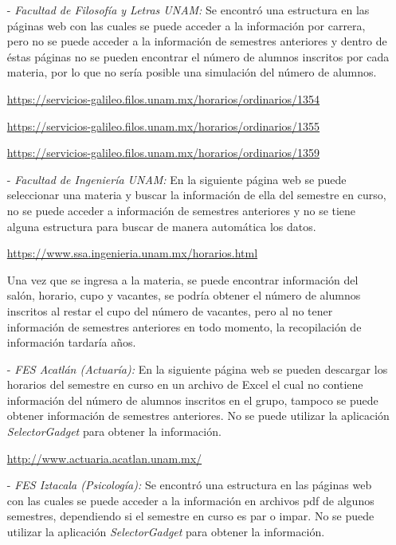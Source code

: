 \begin{itemize}
\item[-] \textit{Facultad de Filosofía y Letras UNAM:} Se encontró una estructura en las páginas web con las cuales se puede acceder a la información por carrera, pero no se puede acceder a la información de semestres anteriores y dentro de éstas páginas no se pueden encontrar el número de alumnos inscritos por cada materia, por lo que no sería posible una simulación del número de alumnos.

\url{https://servicios-galileo.filos.unam.mx/horarios/ordinarios/1354}

\url{https://servicios-galileo.filos.unam.mx/horarios/ordinarios/1355}

\url{https://servicios-galileo.filos.unam.mx/horarios/ordinarios/1359}


\item[-] \textit{Facultad de Ingeniería UNAM:} En la siguiente página web se puede seleccionar una materia y buscar la información de ella del semestre en curso, no se puede acceder a información de semestres anteriores y no se tiene alguna estructura para buscar de manera automática los datos.

\url{https://www.ssa.ingenieria.unam.mx/horarios.html}

Una vez que se ingresa a la materia, se puede encontrar información del salón, horario, cupo y vacantes, se podría obtener el número de alumnos inscritos al restar el cupo del número de vacantes, pero al no tener información de semestres anteriores en todo momento, la recopilación de información tardaría años.

\item[-] \textit{FES Acatlán (Actuaría):} En la siguiente página web se pueden descargar los horarios del semestre en curso en un archivo de Excel el cual no contiene información del número de alumnos inscritos en el grupo, tampoco se puede obtener información de semestres anteriores. No se puede utilizar la aplicación \textit{SelectorGadget} para obtener la información.

\url{http://www.actuaria.acatlan.unam.mx/}

\item[-] \textit{FES Iztacala (Psicología):} Se encontró una estructura en las páginas web con las cuales se puede acceder a la información en archivos pdf de algunos semestres, dependiendo si el semestre en curso es par o impar. No se puede utilizar la aplicación \textit{SelectorGadget} para obtener la información.


\end{itemize}
